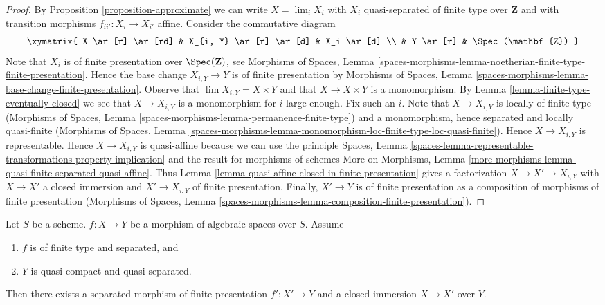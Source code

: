 \begin{proof}
By Proposition \ref{proposition-approximate}
we can write $X = \lim_i X_i$ with $X_i$ quasi-separated of finite type over
$\mathbf{Z}$ and with transition morphisms $f_{ii'} : X_i \to X_{i'}$ affine.
Consider the commutative diagram
$$
\xymatrix{
X \ar[r] \ar[rd] & X_{i, Y} \ar[r] \ar[d] & X_i \ar[d] \\
& Y \ar[r] & \Spec(\mathbf{Z})
}
$$
Note that $X_i$ is of finite presentation over $\Spec(\mathbf{Z})$, see
Morphisms of Spaces, Lemma
\ref{spaces-morphisms-lemma-noetherian-finite-type-finite-presentation}.
Hence the base change $X_{i, Y} \to Y$ is of finite presentation by
Morphisms of Spaces, Lemma
\ref{spaces-morphisms-lemma-base-change-finite-presentation}.
Observe that $\lim X_{i, Y} = X \times Y$ and that $X \to X \times Y$ is a
monomorphism. By Lemma \ref{lemma-finite-type-eventually-closed}
we see that $X \to X_{i, Y}$ is a monomorphism for $i$ large enough.
Fix such an $i$. Note that $X \to X_{i, Y}$ is locally of finite type
(Morphisms of Spaces, Lemma
\ref{spaces-morphisms-lemma-permanence-finite-type})
and a monomorphism, hence separated and locally quasi-finite
(Morphisms of Spaces, Lemma
\ref{spaces-morphisms-lemma-monomorphism-loc-finite-type-loc-quasi-finite}).
Hence $X \to X_{i, Y}$ is representable.
Hence $X \to X_{i, Y}$ is quasi-affine because we can use the
principle Spaces, Lemma
\ref{spaces-lemma-representable-transformations-property-implication}
and the result for morphisms of schemes More on Morphisms, Lemma
\ref{more-morphisms-lemma-quasi-finite-separated-quasi-affine}.
Thus Lemma \ref{lemma-quasi-affine-closed-in-finite-presentation}
gives a factorization $X \to X' \to X_{i, Y}$
with $X \to X'$ a closed immersion and $X' \to X_{i, Y}$ of finite
presentation. Finally, $X' \to Y$ is of finite presentation as a
composition of morphisms of finite presentation
(Morphisms of Spaces, Lemma
\ref{spaces-morphisms-lemma-composition-finite-presentation}).
\end{proof}

\begin{proposition}
\label{proposition-separated-closed-in-finite-presentation}
Let $S$ be a scheme. $f : X \to Y$ be a morphism of algebraic spaces
over $S$. Assume
\begin{enumerate}
\item $f$ is of finite type and separated, and
\item $Y$ is quasi-compact and quasi-separated.
\end{enumerate}
Then there exists a separated morphism of finite presentation
$f' : X' \to Y$ and a closed immersion $X \to X'$ over $Y$.
\end{proposition}

